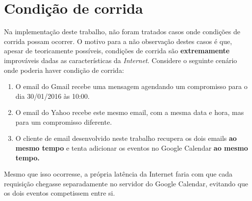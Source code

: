 \documentclass[10pt]{article}
\begin{document}
\section{Condição de corrida}
Na implementação deste trabalho, não foram tratados casos onde condições de corrida possam ocorrer. O motivo para a não observação destes casos é que, apesar de teoricamente possíveis, condições de corrida são \textbf{extremamente} improváveis dadas as características da \textit{Internet}. Considere o seguinte cenário onde poderia haver condição de corrida:
\begin{enumerate}
 \item O email do Gmail recebe uma mensagem agendando um compromisso para o dia 30/01/2016 às 10:00.
 \item O email do Yahoo recebe este mesmo email, com a mesma data e hora, mas para um compromisso diferente.
 \item O cliente de email desenvolvido neste trabalho recupera os dois emails \textbf{ao mesmo tempo} e tenta adicionar os eventos no Google Calendar \textbf{ao mesmo tempo.}
\end{enumerate}

Mesmo que isso ocorresse, a própria latência da Internet faria com que cada requisição chegasse separadamente no servidor do Google Calendar, evitando que os dois eventos competissem entre si.
\end{document}

